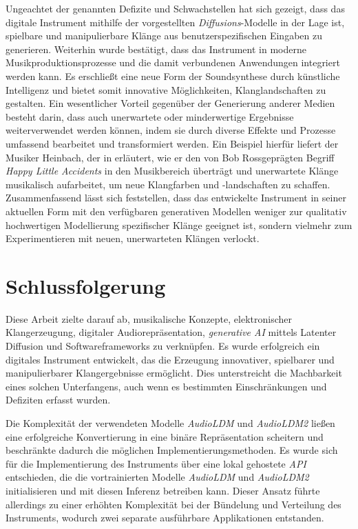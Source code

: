 \documentclass[
  a4paper,  %
  twoside,  %
  bibliography=totoc,
  headsepline,
  cleardoublepage=empty,
  parskip=half,
  draft=false
]{scrbook}
\begin{document}
Ungeachtet der genannten Defizite und Schwachstellen hat sich gezeigt, dass das digitale Instrument mithilfe der vorgestellten \emph{Diffusions}-Modelle in der Lage ist, spielbare und manipulierbare Klänge aus benutzerspezifischen Eingaben zu generieren. Weiterhin wurde bestätigt, dass das Instrument in moderne Musikproduktionsprozesse und die damit verbundenen Anwendungen integriert werden kann. Es erschließt eine neue Form der Soundsynthese durch künstliche Intelligenz und bietet somit innovative Möglichkeiten, Klanglandschaften zu gestalten. Ein wesentlicher Vorteil gegenüber der Generierung anderer Medien besteht darin, dass auch unerwartete oder minderwertige Ergebnisse weiterverwendet werden können, indem sie durch diverse Effekte und Prozesse umfassend bearbeitet und transformiert werden. Ein Beispiel hierfür liefert der Musiker \glqq Heinbach\grqq, der in \cite{hainbach_how_2021} erläutert, wie er den von \glqq Bob Ross\grqq geprägten Begriff \emph{Happy Little Accidents} in den Musikbereich überträgt und unerwartete Klänge musikalisch aufarbeitet, um neue Klangfarben und -landschaften zu schaffen. Zusammenfassend lässt sich feststellen, dass das entwickelte Instrument in seiner aktuellen Form mit den verfügbaren generativen Modellen weniger zur qualitativ hochwertigen Modellierung spezifischer Klänge geeignet ist, sondern vielmehr zum Experimentieren mit neuen, unerwarteten Klängen verlockt.

\chapter{Schlussfolgerung}
Diese Arbeit zielte darauf ab, musikalische Konzepte, elektronischer Klangerzeugung, digitaler Audiorepräsentation, \emph{generative AI} mittels Latenter Diffusion und Softwareframeworks zu verknüpfen. Es wurde erfolgreich ein digitales Instrument entwickelt, das die Erzeugung innovativer, spielbarer und manipulierbarer Klangergebnisse ermöglicht. Dies unterstreicht die Machbarkeit eines solchen Unterfangens, auch wenn es bestimmten Einschränkungen und Defiziten erfasst wurden.

Die Komplexität der verwendeten Modelle \emph{AudioLDM} \cite{liu_audioldm_2023} und \emph{AudioLDM2} \cite{liu_audioldm2_2023} ließen eine erfolgreiche Konvertierung in eine binäre Repräsentation scheitern und beschränkte dadurch die möglichen Implementierungsmethoden. Es wurde sich für die Implementierung des Instruments über eine lokal gehostete \emph{API} entschieden, die die vortrainierten Modelle \emph{AudioLDM} und \emph{AudioLDM2} initialisieren und mit diesen Inferenz betreiben kann. Dieser Ansatz führte allerdings zu einer erhöhten Komplexität bei der Bündelung und Verteilung des Instruments, wodurch zwei separate ausführbare Applikationen entstanden.
\end{document}
